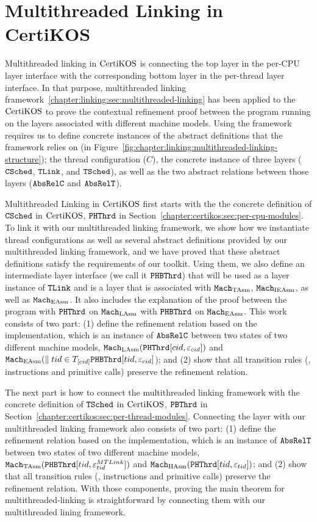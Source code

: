 \section{Multithreaded Linking in CertiKOS}
\label{chapter:certikos:sec:multithreaded-linking-for-certikos}


Multithreaded linking in $\mathrm{CertiKOS}$ is connecting the top layer in the per-CPU layer interface with
the corresponding bottom layer in the per-thread layer interface. 
In that purpose, multithreaded linking framework~\ref{chapter:linking:sec:multithreaded-linking} 
has been applied to the $\mathrm{CertiKOS}$ to prove the contextual refinement proof between the program running on the layers associated with different machine models.
Using the framework requires us to define concrete instances 
of the abstract definitions that the framework relies on (in Figure~\ref{fig:chapter:linking:multithreaded-linking-structure});
the thread configuration ($C$), the concrete instance of three layers (${{\mathrm{\texttt{CSched}}}}$, ${{\mathrm{\texttt{TLink}}}}$, and ${{\mathrm{\texttt{TSched}}}}$), 
as well as the two abstract relations between those layers (${{\mathrm{\texttt{AbsRelC}}}}$ and ${{\mathrm{\texttt{AbsRelT}}}}$). 

Multithreaded Linking in $\mathrm{CertiKOS}$ first starts with the the concrete definition of ${{\mathrm{\texttt{CSched}}}}$ in $\mathrm{CertiKOS}$, ${{\mathrm{\texttt{PHThrd}}}}$ in Section~\ref{chapter:certikos:sec:per-cpu-modules}.
To link it with our multithreaded linking framework,
we show how we instantiate thread configurations as well as several abstract definitions provided by our multithreaded linking framework, and we have proved that these abstract definitions satisfy the requirements of our toolkit.
Using them, we also define an intermediate layer interface (we call it ${{\mathrm{\texttt{PHBThrd}}}}$) that will be used as a layer instance of ${{\mathrm{\texttt{TLink}}}}$ and is a layer that is associated with ${\mathrm{\texttt{Mach}}}_{\mathrm{TAsm}}$, ${\mathrm{\texttt{Mach}}}_{\mathrm{IEAsm}}$, as well as ${\mathrm{\texttt{Mach}}}_{\mathrm{EAsm}}$.
It also includes  the explanation of the proof between the program with  ${{\mathrm{\texttt{PHThrd}}}}$ on ${\mathrm{\texttt{Mach}}}_{\mathrm{LAsm}}$ 
with ${{\mathrm{\texttt{PHBThrd}}}}$ on ${\mathrm{\texttt{Mach}}}_{\mathrm{EAsm}}$. 
This work consists of two part:  (1) define the refinement relation based on the implementation, which is an instance of ${{\mathrm{\texttt{AbsRelC}}}}$ between two states of two different machine models,
${\mathrm{\texttt{Mach}}}_{\mathrm{LAsm}}({{\mathrm{\texttt{PHThrd}}}}[cid, {\varepsilon}_{cid}])$ and 
${\mathrm{\texttt{Mach}}}_{\mathrm{EAsm}}(\parallel tid \in T_{[cid]} {{\mathrm{\texttt{PHBThrd}}}}[tid, {\varepsilon}_{cid}]$); and 
(2) show that all transition rules (\ie, instructions and primitive calls) preserve the refinement relation. 

The next part is how to connect the multithreaded linking framework with the concrete definition of  ${{\mathrm{\texttt{TSched}}}}$ in $\mathrm{CertiKOS}$, ${{\mathrm{\texttt{PBThrd}}}}$ in Section~\ref{chapter:certikos:sec:per-thread-modules}.
Connecting the layer with our multithreaded linking framework also consists of two part:  (1) define the refinement relation based on the implementation, which is an instance of ${{\mathrm{\texttt{AbsRelT}}}}$ between two states of two different machine models,
${\mathrm{\texttt{Mach}}}_{\mathrm{TAsm}}({{\mathrm{\texttt{PHBThrd}}}}[tid, {\varepsilon}^{MTLink}_{tid}])$ and 
${\mathrm{\texttt{Mach}}}_{\mathrm{HAsm}}({{\mathrm{\texttt{PHThrd}}}}[tid, {\varepsilon}_{tid}])$; and 
(2) show that all transition rules (\ie, instructions and primitive calls) preserve the refinement relation. 
With those components, proving the main theorem for multithreaded-linking is straightforward by connecting 
them with our multithreaded lining framework.


